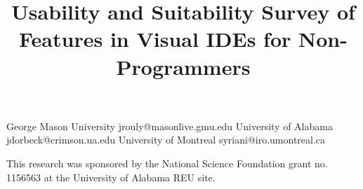 \documentclass[10pt]{sigplanconf}
\begin{document}

\setlength{\pdfpageheight}{\paperheight}
\setlength{\pdfpagewidth}{\paperwidth}





\title{Usability and Suitability Survey of Features in Visual IDEs for Non-Programmers}

           {George Mason University}
           {jrouly@masonlive.gmu.edu}
           {University of Alabama}
           {jdorbeck@crimson.ua.edu}
           {University of Montreal}
           {syriani@iro.umontreal.ca}

\maketitle





%










\acks

This research was sponsored by the National Science Foundation grant no. 1156563 at the University of Alabama REU site.
\end{document}
